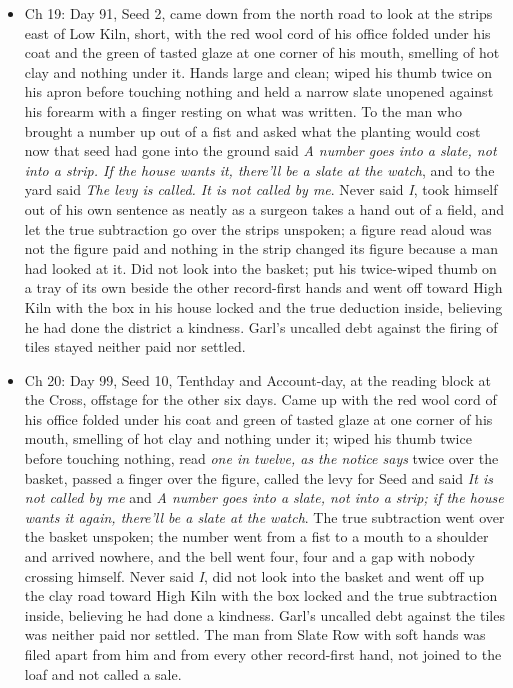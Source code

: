 \documentclass{design/chronicle}
\begin{document}
{\begin{itemize}[leftmargin=1.4em,itemsep=1pt,topsep=3pt,parsep=0pt]
\item Ch 19: Day 91, Seed 2, came down from the north road to look at the strips east of Low Kiln, short, with the red wool cord of his office folded under his coat and the green of tasted glaze at one corner of his mouth, smelling of hot clay and nothing under it. Hands large and clean; wiped his thumb twice on his apron before touching nothing and held a narrow slate unopened against his forearm with a finger resting on what was written. To the man who brought a number up out of a fist and asked what the planting would cost now that seed had gone into the ground said \emph{A number goes into a slate, not into a strip. If the house wants it, there’ll be a slate at the watch}, and to the yard said \emph{The levy is called. It is not called by me}. Never said \emph{I}, took himself out of his own sentence as neatly as a surgeon takes a hand out of a field, and let the true subtraction go over the strips unspoken; a figure read aloud was not the figure paid and nothing in the strip changed its figure because a man had looked at it. Did not look into the basket; put his twice-wiped thumb on a tray of its own beside the other record-first hands and went off toward High Kiln with the box in his house locked and the true deduction inside, believing he had done the district a kindness. Garl’s uncalled debt against the firing of tiles stayed neither paid nor settled.

\end{itemize}

\begin{itemize}[leftmargin=1.4em,itemsep=1pt,topsep=3pt,parsep=0pt]

\item Ch 20: Day 99, Seed 10, Tenthday and Account-day, at the reading block at the Cross, offstage for the other six days. Came up with the red wool cord of his office folded under his coat and green of tasted glaze at one corner of his mouth, smelling of hot clay and nothing under it; wiped his thumb twice before touching nothing, read \emph{one in twelve, as the notice says} twice over the basket, passed a finger over the figure, called the levy for Seed and said \emph{It is not called by me} and \emph{A number goes into a slate, not into a strip; if the house wants it again, there’ll be a slate at the watch}. The true subtraction went over the basket unspoken; the number went from a fist to a mouth to a shoulder and arrived nowhere, and the bell went four, four and a gap with nobody crossing himself. Never said \emph{I}, did not look into the basket and went off up the clay road toward High Kiln with the box locked and the true subtraction inside, believing he had done a kindness. Garl’s uncalled debt against the tiles was neither paid nor settled. The man from Slate Row with soft hands was filed apart from him and from every other record-first hand, not joined to the loaf and not called a sale.


\end{itemize}}
\end{document}
